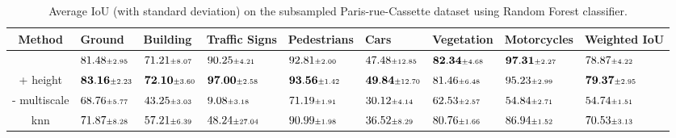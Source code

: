 \documentclass{article}
\begin{document}
\begin{table}
    \hspace*{-3cm}
    \begin{tabular}{cllllllll}
        Method & Ground & Building & Traffic Signs & Pedestrians & Cars & Vegetation & Motorcycles & Weighted IoU \\
        \hline
        \cite{thomas_semantic_2018} & $81.48 \mtiny{\pm 2.95}$ & $71.21 \mtiny{\pm 8.07}$ & $90.25 \mtiny{\pm 4.21}$ & $92.81 \mtiny{\pm 2.00}$ & $47.48 \mtiny{\pm 12.85}$ & $\mathbf{82.34} \mtiny{\pm 4.68}$ & $\mathbf{97.31} \mtiny{\pm 2.27}$ & $78.87 \mtiny{\pm 4.22}$ \\
        + height & $\mathbf{83.16} \mtiny{\pm 2.23}$ & $\mathbf{72.10} \mtiny{\pm 3.60}$ & $\mathbf{97.00} \mtiny{\pm 2.58}$ & $\mathbf{93.56} \mtiny{\pm 1.42}$ & $\mathbf{49.84} \mtiny{\pm 12.70}$ & $81.46 \mtiny{\pm 6.48}$ & $95.23 \mtiny{\pm 2.99}$ & $\mathbf{79.37} \mtiny{\pm 2.95}$ \\
        - multiscale & $68.76 \mtiny{\pm 5.77}$ & $43.25 \mtiny{\pm 3.03}$ & $9.08 \mtiny{\pm 3.18}$ & $71.19 \mtiny{\pm 1.91}$ & $30.12 \mtiny{\pm 4.14}$ & $62.53 \mtiny{\pm 2.57}$ & $54.84 \mtiny{\pm 2.71}$ & $54.74 \mtiny{\pm 1.51}$ \\
        knn & $71.87 \mtiny{\pm 8.28}$ & $57.21 \mtiny{\pm 6.39}$ & $48.24 \mtiny{\pm 27.04}$ & $90.99 \mtiny{\pm 1.98}$ & $36.52 \mtiny{\pm 8.29}$ & $80.76 \mtiny{\pm 1.66}$ & $86.94 \mtiny{\pm 1.52}$ & $70.53 \mtiny{\pm 3.13}$ \\
\end{tabular}
\caption{ Average IoU (with standard deviation) on the subsampled Paris-rue-Cassette dataset using Random Forest classifier.}
    \label{tab:benchmark_RF}
\end{table}
\end{document}

